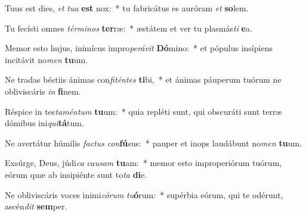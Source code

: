 \item Tuus est dies, \textit{et} \textit{tu}\textit{a} \textbf{est} nox:~* tu fabricátus es auróram \textit{et} \textbf{so}lem.
\item Tu fecísti omnes \textit{tér}\textit{mi}\textit{nos} \textbf{ter}ræ:~* æstátem et ver tu plasmás\textit{ti} \textbf{e}a.
\item Memor esto hujus, inimícus impro\textit{pe}\textit{rá}\textit{vit} \textbf{Dó}mino:~* et pópulus insípiens incitávit no\textit{men} \textbf{tu}um.
\item Ne tradas béstiis ánimas con\textit{fi}\textit{tén}\textit{tes} \textbf{ti}bi,~* et ánimas páuperum tuórum ne obliviscáris \textit{in} \textbf{fi}nem.
\item Réspice in tes\textit{ta}\textit{mén}\textit{tum} \textbf{tu}um:~* quia repléti sunt, qui obscuráti sunt terræ dómibus ini\textit{qui}\textbf{tá}tum.
\item Ne avertátur húmilis \textit{fac}\textit{tus} \textit{con}\textbf{fú}sus:~* pauper et inops laudábunt no\textit{men} \textbf{tu}um.
\item Exsúrge, Deus, júdi\textit{ca} \textit{cau}\textit{sam} \textbf{tu}am:~* memor esto improperiórum tuórum, eórum quæ ab insipiénte sunt to\textit{ta} \textbf{di}e.
\item Ne obliviscáris voces inimi\textit{có}\textit{rum} \textit{tu}\textbf{ó}rum:~* supérbia eórum, qui te odérunt, ascén\textit{dit} \textbf{sem}per.
